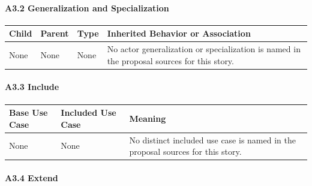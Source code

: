 \documentclass[12pt]{article}
\renewcommand{\baselinestretch}{1.5}
\begin{document}
\hypertarget{sec:a3-2-generalization-and-specialization}{}
\paragraph*{A3.2 Generalization and Specialization}
\par\medskip

\begingroup
\small
\renewcommand{\baselinestretch}{1.0}\selectfont
\renewcommand{\arraystretch}{1.15}
\setlength{\tabcolsep}{6pt}
\begin{longtable}{|>{\raggedright\arraybackslash}p{}|>{\raggedright\arraybackslash}p{}|>{\raggedright\arraybackslash}p{}|>{\raggedright\arraybackslash}p{}|}
\hline
\textbf{Child} & \textbf{Parent} & \textbf{Type} & \textbf{Inherited Behavior or Association} \\ \hline
\endhead
None & None & None & No actor generalization or specialization is named in the proposal sources for this story. \\ \hline
\end{longtable}
\endgroup
\par\medskip

\hypertarget{sec:a3-3-include}{}
\paragraph*{A3.3 Include}
\par\medskip

\begingroup
\small
\renewcommand{\baselinestretch}{1.0}\selectfont
\renewcommand{\arraystretch}{1.15}
\setlength{\tabcolsep}{6pt}
\begin{longtable}{|>{\raggedright\arraybackslash}p{}|>{\raggedright\arraybackslash}p{}|>{\raggedright\arraybackslash}p{}|}
\hline
\textbf{Base Use Case} & \textbf{Included Use Case} & \textbf{Meaning} \\ \hline
\endhead
None & None & No distinct included use case is named in the proposal sources for this story. \\ \hline
\end{longtable}
\endgroup
\par\medskip

\hypertarget{sec:a3-4-extend}{}
\paragraph*{A3.4 Extend}
\par\medskip
\end{document}
